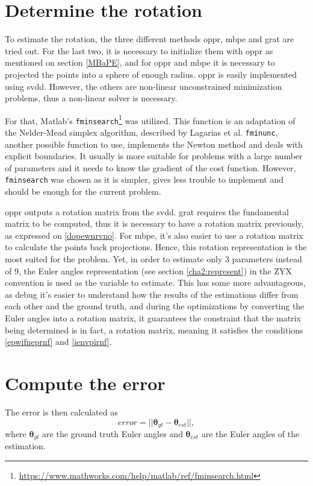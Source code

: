\section{Determine the rotation}
To estimate the rotation, the three different methods \acrshort{oppr}, \acrshort{mbpe} and \acrshort{grat} are tried out. For the last two, it is necessary to initialize them with \acrshort{oppr} as mentioned on section \ref{MBaPE}, and for \acrshort{oppr} and \acrshort{mbpe} it is necessary to projected the points into a sphere of enough radius. \acrshort{oppr} is easily implemented using \acrshort{svdd}. However, the others are non-linear unconstrained minimization problems, thus a non-linear solver is necessary. 

For that, Matlab's \texttt{fminsearch}\footnote{\href{https://www.mathworks.com/help/matlab/ref/fminsearch.html}{https://www.mathworks.com/help/matlab/ref/fminsearch.html}} was utilized. This function is an adaptation of the Nelder-Mead simplex algorithm, described by Lagarias et al. \cite{lagarias} \texttt{fminunc}, another possible function to use, implements the Newton method and deals with explicit boundaries. It usually is more suitable for problems with a large number of parameters and it needs to know the gradient of the cost function. However, \texttt{fminsearch} was chosen as it is simpler, gives less trouble to implement and should be enough for the current problem.

\acrshort{oppr} outputs a rotation matrix from the \acrshort{svdd}.
\acrshort{grat} requires the fundamental matrix to be computed, thus it is necessary to have a rotation matrix previously, as expressed on \ref{dopewnrvno}. For \acrshort{mbpe}, it's also easier to use a rotation matrix to calculate the points back projections. Hence, this rotation representation is the most suited for the problem. Yet, in order to estimate only 3 parameters instead of 9, the Euler angles representation (see section \ref{cha2:represent}) in the ZYX convention is used as the variable to estimate. This has some more advantageous, as debug it's easier to understand how the results of the estimations differ from each other and the ground truth, and during the optimizations by converting the Euler angles into a rotation matrix, it guarantees the constraint that the matrix being determined is in fact, a rotation matrix, meaning it satisfies the conditions \ref{epwifneprnf} and \ref{ienvpirnf}.

\section{Compute the error}
The error is then calculated as
\begin{equation}
	error = ||{\mathbf{ \theta}_{gt}-\mathbf{ \theta}_{est}}||,
	\label{firenr}
\end{equation}
where $\mathbf{ \theta}_{gt}$ are the ground truth Euler angles and $\mathbf{ \theta}_{est}$ are the Euler angles of the estimation.


